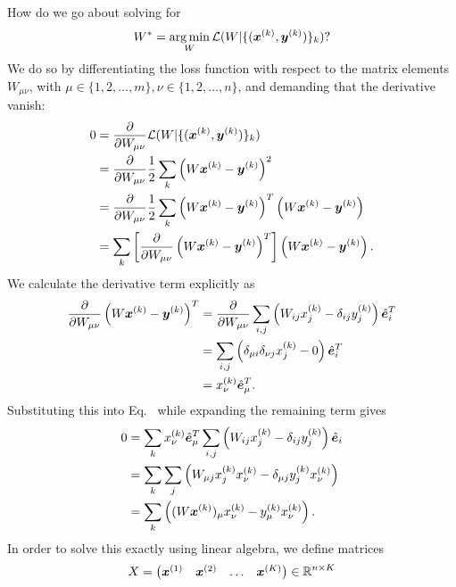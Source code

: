 \vspace{\baselineskip}
How do we go about solving for
%
\begin{equation}
    W^* = \operatorname*{arg\,min}_W \mathcal{L}(W | \{(\bm{x}^{(k)}, \bm{y}^{(k)})\}_k)?
\end{equation}
%
We do so by differentiating the loss function with respect to the matrix elements $W_{\mu\nu}$, with
$\mu \in \{1, 2, \dots, m\}, \nu \in \{1, 2, \dots, n\}$, and demanding that the derivative vanish:
%
\begin{align}
    \label{equation:l2-loss-minimization}
    0 &= \frac{\partial }{\partial W_{\mu\nu}} \mathcal{L}(W | \{(\bm{x}^{(k)}, \bm{y}^{(k)})\}_k) \nonumber\\
      &= \frac{\partial }{\partial W_{\mu\nu}} \frac{1}{2} \sum_k \left(W \bm{x}^{(k)} - \bm{y}^{(k)} \right)^2 \nonumber\\
      &= \frac{\partial }{\partial W_{\mu\nu}} \frac{1}{2} \sum_k \left(W \bm{x}^{(k)} - \bm{y}^{(k)} \right)^T \left(W \bm{x}^{(k)} - \bm{y}^{(k)} \right) \nonumber\\
      &= \sum_k \left[\frac{\partial }{\partial W_{\mu\nu}} \left(W \bm{x}^{(k)} - \bm{y}^{(k)} \right)^T \right] \left(W \bm{x}^{(k)} - \bm{y}^{(k)} \right).
\end{align}
%
We calculate the derivative term explicitly as
%
\begin{align}
    \frac{\partial }{\partial W_{\mu\nu}} \left(W \bm{x}^{(k)} - \bm{y}^{(k)} \right)^T &= \frac{\partial }{\partial W_{\mu\nu}} \sum_{i,j} \left(W_{ij} x^{(k)}_j - \delta_{ij} y^{(k)}_j \right)
                                                                 \hat{\bm{e}}^T_i \nonumber\\
        &= \sum_{i,j} \left(\delta_{\mu i} \delta_{\nu j} x^{(k)}_j - 0 \right) \hat{\bm{e}}^T_i \nonumber\\
        &= x^{(k)}_\nu \hat{\bm{e}}^T_\mu.
\end{align}
%
Substituting this into Eq.~ while expanding the remaining term gives
%
\begin{align}
    \label{equation:l2-loss-minimization-differentiated}
    0 &= \sum_k x^{(k)}_\nu \hat{\bm{e}}^T_\mu \sum_{i,j} \left(W_{ij} x^{(k)}_j - \delta_{ij} y^{(k)}_j \right) \hat{\bm{e}}_i \nonumber\\
      &= \sum_k \sum_{j} \left(W_{\mu j} x^{(k)}_j x^{(k)}_\nu - \delta_{\mu j} y^{(k)}_j x^{(k)}_\nu \right) \nonumber\\
      &= \sum_k \left((W \bm{x}^{(k)})_\mu x^{(k)}_\nu - y^{(k)}_\mu x^{(k)}_\nu \right).
\end{align}
%
In order to solve this exactly using linear algebra, we define matrices
%
\begin{equation}
    X = \begin{pmatrix}
        \bm{x}^{(1)} & \bm{x}^{(2)} & \dots & \bm{x}^{(K)}
    \end{pmatrix} \in \mathbb{R}^{n \times K}
\end{equation}
